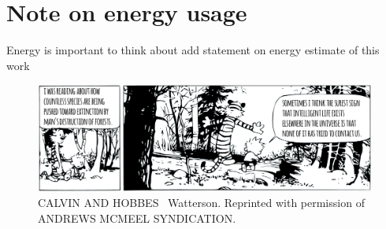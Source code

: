 
\chapter{Note on energy usage}



Energy is important to think about
add statement on energy estimate of this work 






\begin{figure}
\begin{center}
\centerline{\includegraphics[width=1\linewidth]{figures/calvin_and_hobbes_2.png}}
  \caption*{\tiny CALVIN AND HOBBES \textcopyright\  Watterson. Reprinted with permission of ANDREWS MCMEEL SYNDICATION.}
\end{center}
\end{figure}